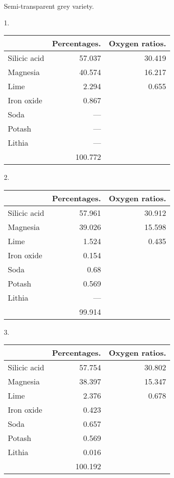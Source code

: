 \documentclass[a4paper, 12pt, oneside]{article}
\begin{document}
\begin{center}
Semi-transparent grey variety.
\end{center}
\begin{center}
1. 
\end{center}
\begin{table}[H]
    \centering
    \footnotesize
    \begin{tabular}{l r r}
        ~ & Percentages. & Oxygen ratios. \\ \hline
        Silicic acid & 57.037 & 30.419 \\
        Magnesia & 40.574 & 16.217 \\
        Lime & 2.294 & 0.655 \\
        Iron oxide & 0.867 & ~ \\
        Soda & --- & ~ \\
        Potash & --- & ~ \\
        Lithia & --- & ~ \\ \hline
        ~ & 100.772 & ~ \\
    \end{tabular}
\end{table}
\begin{center}
2.
\end{center}
\begin{table}[H]
    \centering
    \footnotesize
    \begin{tabular}{l r r}
        ~ & Percentages. & Oxygen ratios. \\ \hline
        Silicic acid & 57.961 & 30.912 \\
        Magnesia & 39.026 & 15.598 \\
        Lime & 1.524 & 0.435 \\
        Iron oxide & 0.154 & ~ \\
        Soda & 0.68 & ~ \\
        Potash & 0.569 & ~ \\
        Lithia & --- & ~ \\ \hline
        ~ & 99.914 & \\
    \end{tabular}
\end{table}
\begin{center}
3. 
\end{center}
\begin{table}[H]
    \centering
    \footnotesize
    \begin{tabular}{l r r}
        ~ & Percentages. & Oxygen ratios. \\ \hline
        Silicic acid & 57.754 & 30.802 \\
        Magnesia & 38.397 & 15.347 \\
        Lime & 2.376 & 0.678 \\
        Iron oxide & 0.423 & ~ \\
        Soda & 0.657 & ~ \\
        Potash & 0.569 & ~ \\
        Lithia & 0.016 & ~ \\ \hline
        ~ & 100.192 & ~ \\
    \end{tabular}
\end{table}
\end{document}

